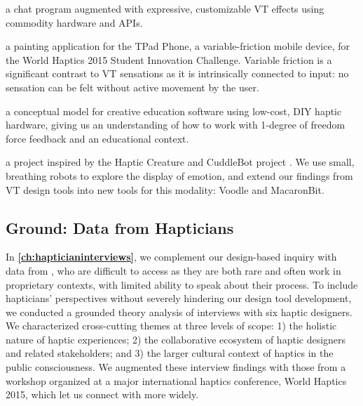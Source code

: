  a chat program augmented with expressive, customizable VT effects using commodity hardware and APIs.
	
  a painting application for the TPad Phone, a variable-friction mobile device, for the World Haptics 2015 Student Innovation Challenge. 
	Variable friction is a significant contrast to VT sensations as it is intrinsically connected to input: no sensation can be felt without active movement by the user.
	
 a conceptual model for creative education software using low-cost, DIY haptic hardware, giving us an understanding of how to work with 1-degree of freedom force feedback and an educational context.

 a project inspired by the Haptic Creature \cite{Yohanan2011affectivetouch,Yohanan2011affectdisplay,Chang2010} and CuddleBot project \cite{Allen2015cuddlebot}.
	We use small, breathing robots to explore the display of emotion, and extend our findings from VT design tools into new tools for this modality: Voodle and MacaronBit.




\subsection{Ground: Data from Hapticians}
In \textbf{\autoref{ch:hapticianinterviews}}, we complement our design-based inquiry with data from , who are difficult to access as they are both rare and often work in proprietary contexts, with limited ability to speak about their process.
To include hapticians' perspectives without severely hindering our design tool development, we conducted a grounded theory analysis of interviews with six haptic designers.
We characterized cross-cutting themes at three levels of scope: 1) the holistic nature of haptic experiences; 2) the collaborative ecosystem of haptic designers and related stakeholders; and 3) the larger cultural context of haptics in the public consciousness.
We augmented these interview findings with those from a workshop  organized at a major international haptics conference, World Haptics 2015, which let us connect with  more widely.


